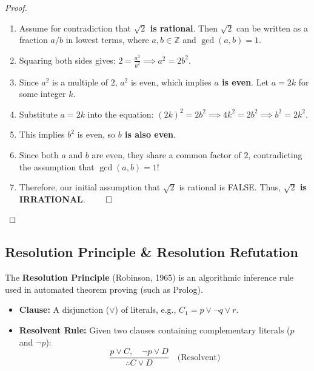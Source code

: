 \documentclass[11pt,a4paper]{article}
\begin{document}
\begin{proof}
\begin{enumerate}[leftmargin=1.5em]
    \item Assume for contradiction that \textbf{$\sqrt{2}$ is rational}. Then $\sqrt{2}$ can be written as a fraction $a/b$ in lowest terms, where $a, b \in \mathbb{Z}$ and $\gcd(a, b) = 1$.
    \item Squaring both sides gives: $2 = \frac{a^2}{b^2} \implies a^2 = 2b^2$.
    \item Since $a^2$ is a multiple of $2$, $a^2$ is even, which implies \textbf{$a$ is even}. Let $a = 2k$ for some integer $k$.
    \item Substitute $a = 2k$ into the equation: $(2k)^2 = 2b^2 \implies 4k^2 = 2b^2 \implies b^2 = 2k^2$.
    \item This implies $b^2$ is even, so \textbf{$b$ is also even}.
    \item Since both $a$ and $b$ are even, they share a common factor of $2$, contradicting the assumption that $\gcd(a, b) = 1$!
    \item Therefore, our initial assumption that $\sqrt{2}$ is rational is FALSE. Thus, \textbf{$\sqrt{2}$ is IRRATIONAL}. $\qed$
\end{enumerate}
\end{proof}

\subsection{Resolution Principle \& Resolution Refutation}

The \textbf{Resolution Principle} (Robinson, 1965) is an algorithmic inference rule used in automated theorem proving (such as Prolog).

\begin{definition}
\begin{itemize}[leftmargin=1.5em]
    \item \textbf{Clause:} A disjunction ($\lor$) of literals, e.g., $C_1 = p \lor \neg q \lor r$.
    \item \textbf{Resolvent Rule:} Given two clauses containing complementary literals ($p$ and $\neg p$):
    $$\frac{p \lor C, \quad \neg p \lor D}{\therefore C \lor D} \quad \text{(Resolvent)}$$
\end{itemize}
\end{definition}
\end{document}

